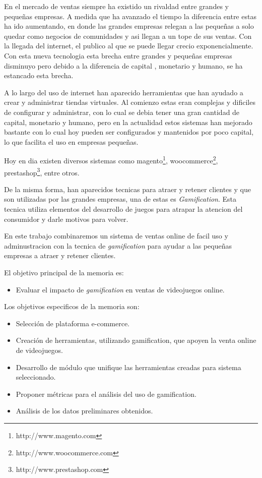 En el mercado de ventas siempre ha existido un rivaldad entre grandes y pequeñas 
empresas. A medida que ha avanzado el tiempo la diferencia entre estas ha ido aumentando,
en donde las grandes empresas relegan a las pequeñas a solo quedar como negocios de 
comunidades y asi llegan a un tope de sus ventas. Con la llegada del internet, el publico 
al que se puede llegar crecio exponencialmente. Con esta nueva tecnologia esta brecha 
entre grandes y pequeñas empresas disminuyo pero debido a la diferencia de capital
, monetario y humano, se ha estancado esta brecha. 

A lo largo del uso de internet han aparecido herramientas que han ayudado a crear y
administrar tiendas virtuales. Al comienzo estas eran complejas y dificiles de configurar
y administrar, con lo cual se debia tener una gran cantidad de capital, monetario y humano,
pero en la actualidad estos sistemas han mejorado bastante con lo cual hoy pueden ser
configurados y mantenidos por poco capital, lo que facilita el uso en empresas pequeñas.

Hoy en dia existen diversos sistemas como magento\footnote{http://www.magento.com}, 
woocommerce\footnote{http://www.woocommerce.com}, prestashop\footnote{http://www.prestashop.com},
entre otros. 

De la misma forma, han aparecidos tecnicas para atraer y retener clientes y que son utilizadas
por las grandes empresas, una de estas es \emph{Gamification}. Esta tecnica utiliza elementos
del desarrollo de juegos para atrapar la atencion del consumidor y darle motivos para volver.

En este trabajo combinaremos un sistema de ventas online de facil uso y adminustracion con
la tecnica de \emph{gamification} para ayudar a las pequeñas empresas a atraer y retener 
clientes.

El objetivo principal de la memoria es:
\begin{itemize}
\item Evaluar el impacto de \emph{gamification} en ventas de videojuegos online.
\end{itemize}

Los objetivos especificos de la memoria son:

\begin{itemize}                                                                      
\item Selección de plataforma e-commerce.
\item Creación de herramientas, utilizando gamification, que apoyen la venta online 
de videojuegos.
\item Desarrollo de módulo que unifique las herramientas creadas para sistema 
seleccionado.
\item Proponer métricas para el análisis del uso de gamification.
\item Análisis de los datos preliminares obtenidos.     
\end{itemize}

